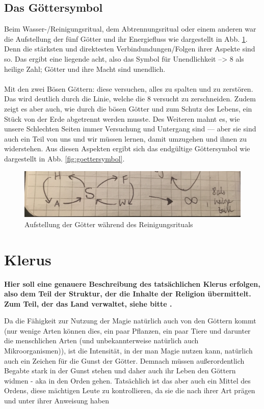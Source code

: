 \subsection{Das Göttersymbol} \label{sec:goettersymbol}
Beim Wasser-/Reinigungsritual, dem Abtrennungsritual oder einem anderen war die Aufstellung der fünf Götter und ihr Energiefluss wie dargestellt in Abb. \ref{fig:goetteraufstellung}. Denn die stärksten und direktesten Verbindundungen/Folgen ihrer Aspekte sind so. Das ergibt eine liegende acht, also das Symbol für Unendlichkeit --> 8 als heilige Zahl; Götter und ihre Macht sind unendlich.\\
\\
Mit den zwei Bösen Göttern: diese versuchen, alles zu spalten und zu zerstören. Das wird deutlich durch die Linie, welche die 8 versucht zu zerschneiden. Zudem zeigt es aber auch, wie durch die bösen Götter und zum Schutz des Lebens, ein Stück von der Erde abgetrennt werden musste. Des Weiteren mahnt es, wie unsere Schlechten Seiten immer Versuchung und Untergang sind — aber sie sind auch ein Teil von uns und wir müssen lernen, damit umzugehen und ihnen zu widerstehen. Aus diesen Aspekten ergibt sich das endgültige Göttersymbol wie dargestellt in Abb. \ref{fig:goettersymbol}.\\

\begin{figure}
	\centering
	\includegraphics[width=0.7\linewidth]{Abbildungen/Gesellschaft/GoetteraufstellungbeiReinigungsritual}
	\caption{Aufstellung der Götter während des Reinigungsrituals}
	\label{fig:goetteraufstellung}
\end{figure}

\section{Klerus}
\textbf{Hier soll eine genauere Beschreibung des tatsächlichen Klerus erfolgen, also dem Teil der Struktur, der die Inhalte der Religion übermittelt. Zum Teil, der das Land verwaltet, siehe bitte .} 

Da die Fähigkeit zur Nutzung der Magie natürlich auch von den Göttern kommt (nur wenige Arten können dies, ein paar Pflanzen, ein paar Tiere und darunter die menschlichen Arten (und unbekannterweise natürlich auch Mikroorganismen)), ist die Intensität, in der man Magie nutzen kann, natürlich auch ein Zeichen für die Gunst der Götter. 
Demnach müssen außerordentlich Begabte stark in der Gunst stehen und daher auch ihr Leben den Göttern widmen - aka in den Orden gehen. 
Tatsächlich ist das aber auch ein Mittel des Ordens, diese mächtigen Leute zu kontrollieren, da sie die nach ihrer Art prägen und unter ihrer Anweisung haben

